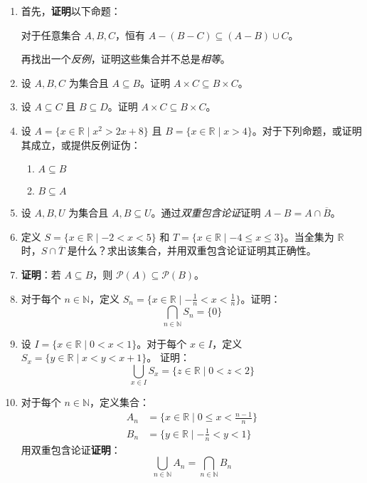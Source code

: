 \begin{enumerate}[label=(\arabic*)]
    \item 首先，\textbf{证明}以下命题：
        \begin{center}
            对于任意集合 $A,B,C$，恒有 $A - (B - C) \subseteq (A - B) \cup C$。
        \end{center}
        再找出一个\emph{反例}，证明这些集合并不总是\emph{相等}。
    \item 设 $A,B,C$ 为集合且 $A \subseteq B$。证明 $A \times C \subseteq B \times C$。
    \item 设 $A \subseteq C$ 且 $B \subseteq D$。证明 $A \times C \subseteq B \times C$。
    \item 设 $A = \{x \in \mathbb{R} \mid x^2 > 2x + 8\}$ 且 $B = \{x \in \mathbb{R} \mid x > 4\}$。对于下列命题，或证明其成立，或提供反例证伪：
        \begin{enumerate}[label=(\alph*)]
            \item $A \subseteq B$
            \item $B \subseteq A$
        \end{enumerate}
    \item 设 $A, B, U$ 为集合且 $A, B \subseteq U$。通过\emph{双重包含论证}证明 $A - B = A \cap \overline{B}$。
    \item 定义 $S = \{x \in \mathbb{R} \mid -2 < x < 5\}$ 和 $T = \{x \in \mathbb{R} \mid -4 \le x \le 3\}$。当全集为 $\mathbb{R}$ 时，$S \cap \overline{T}$ 是什么？求出该集合，并用双重包含论证证明其正确性。
    \item \textbf{证明}：若 $A \subseteq B$，则 $\mathcal{P}(A) \subseteq \mathcal{P}(B)$。\label{exc:exercises3.9.7}
    \item 对于每个 $n \in \mathbb{N}$，定义 $S_n = \{x \in \mathbb{R} \mid -\frac{1}{n} < x < \frac{1}{n}\}$。证明：
        \[\bigcap_{n \in \mathbb{N}}S_n = \{0\}\]
    \item 设 $I = \{x \in \mathbb{R} \mid 0 < x < 1\}$。对于每个 $x \in I$，定义 $S_x = \{y \in \mathbb{R} \mid x < y < x + 1\}$。 证明：
        \[\bigcup_{x \in I}S_x = \{z \in \mathbb{R} \mid 0 < z < 2\}\]
    \item 对于每个 $n \in \mathbb{N}$，定义集合：
        \begin{align*}
            A_n &= \Big\{x \in \mathbb{R} \mid 0 ≤ x < \frac{n - 1}{n}\Big\} \\
            B_n &= \Big\{y \in \mathbb{R} \mid -\frac{1}{n} < y < 1\Big\}
        \end{align*}
        用双重包含论证\textbf{证明}：
        \[\bigcup_{n \in \mathbb{N}}A_n = \bigcap_{n \in \mathbb{N}}B_n\]
\end{enumerate}
